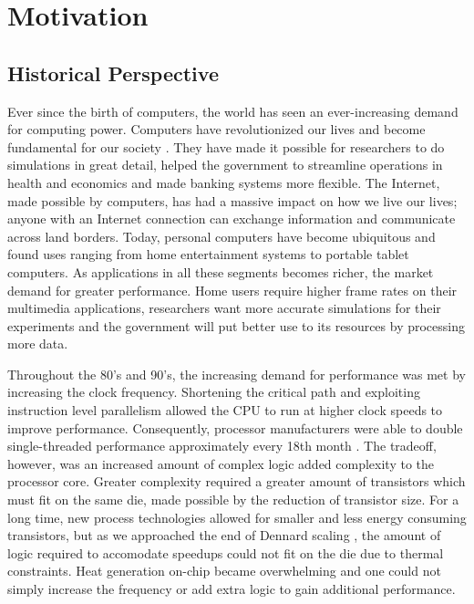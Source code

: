

\section{Motivation}

\subsection{Historical Perspective}

Ever since the birth of computers, the world has seen an ever-increasing demand
for computing power. Computers have revolutionized our lives and become
fundamental for our society \cite{tanenbaum1984structured}. They have made it possible for
researchers to do simulations in great detail, helped the government to
streamline operations in health and economics and made banking systems more
flexible. The Internet, made possible by computers, has had a massive impact on
how we live our lives; anyone with an Internet connection can exchange
information and communicate across land borders. Today, personal computers have
become ubiquitous and found uses ranging from home entertainment systems to
portable tablet computers. As applications in all these segments becomes richer,
the market demand for greater performance. Home users require higher frame
rates on their multimedia applications, researchers want more accurate
simulations for their experiments and the government will put better use to its
resources by processing more data.

Throughout the 80's and 90's, the increasing demand for performance was met by
increasing the clock frequency. Shortening the critical path and exploiting
instruction level parallelism allowed the CPU to run at higher clock speeds to
improve performance. Consequently, processor manufacturers were able to double
single-threaded performance approximately every 18th month
\cite{moore1965cramming}. The tradeoff, however, was an increased amount of
complex logic added complexity to the processor core. Greater complexity
required a greater amount of transistors which must fit on the same die, made
possible by the reduction of transistor size. For a long time, new process
technologies allowed for smaller and less energy consuming transistors, but as
we approached the end of Dennard scaling
\cite{dennard1974design,esmaeilzadeh2011dark}, the amount of logic required to
accomodate speedups could not fit on the die due to thermal constraints. Heat
generation on-chip became overwhelming and one could not simply increase the
frequency or add extra logic to gain additional performance.

